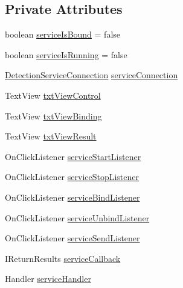 \subsection*{Private Attributes}
\begin{DoxyCompactItemize}
\item 
boolean \hyperlink{classch_1_1zhaw_1_1ba10__bsha__1_1_1ime_1_1ServiceTest_a1be1618594a88e74deea51ba0c351fd5}{serviceIsBound} = false
\item 
boolean \hyperlink{classch_1_1zhaw_1_1ba10__bsha__1_1_1ime_1_1ServiceTest_a9e8f69bb91fbb935e81e07c927bc07ed}{serviceIsRunning} = false
\item 
\hyperlink{classch_1_1zhaw_1_1ba10__bsha__1_1_1ime_1_1ServiceTest_1_1DetectionServiceConnection}{DetectionServiceConnection} \hyperlink{classch_1_1zhaw_1_1ba10__bsha__1_1_1ime_1_1ServiceTest_ac2a420e14076a26d93ed433d75633b12}{serviceConnection}
\item 
TextView \hyperlink{classch_1_1zhaw_1_1ba10__bsha__1_1_1ime_1_1ServiceTest_a3eedc453bc997b1c3b6fed0a3c5cd0d5}{txtViewControl}
\item 
TextView \hyperlink{classch_1_1zhaw_1_1ba10__bsha__1_1_1ime_1_1ServiceTest_a3c1a17a86c78afadef203bdfee113859}{txtViewBinding}
\item 
TextView \hyperlink{classch_1_1zhaw_1_1ba10__bsha__1_1_1ime_1_1ServiceTest_a9f9b094cd1d2a8d0f485a8e5f56da93c}{txtViewResult}
\item 
OnClickListener \hyperlink{classch_1_1zhaw_1_1ba10__bsha__1_1_1ime_1_1ServiceTest_ac61c2027977621a45d5b68999adb3df0}{serviceStartListener}
\item 
OnClickListener \hyperlink{classch_1_1zhaw_1_1ba10__bsha__1_1_1ime_1_1ServiceTest_acf699219d38a24ed7f4de7985cbcb129}{serviceStopListener}
\item 
OnClickListener \hyperlink{classch_1_1zhaw_1_1ba10__bsha__1_1_1ime_1_1ServiceTest_a4fd63657e481b0a7fa19836a9bfad101}{serviceBindListener}
\item 
OnClickListener \hyperlink{classch_1_1zhaw_1_1ba10__bsha__1_1_1ime_1_1ServiceTest_aa8c033e5421b4479f79d96f776aef94b}{serviceUnbindListener}
\item 
OnClickListener \hyperlink{classch_1_1zhaw_1_1ba10__bsha__1_1_1ime_1_1ServiceTest_af3586f921944718d5308e283836cd92f}{serviceSendListener}
\item 
IReturnResults \hyperlink{classch_1_1zhaw_1_1ba10__bsha__1_1_1ime_1_1ServiceTest_a1f4c0d2cd1ee8a21b0864daf0a0ef6c9}{serviceCallback}
\item 
Handler \hyperlink{classch_1_1zhaw_1_1ba10__bsha__1_1_1ime_1_1ServiceTest_a396e691506a0c43959988e291d8281c3}{serviceHandler}
\end{DoxyCompactItemize}
